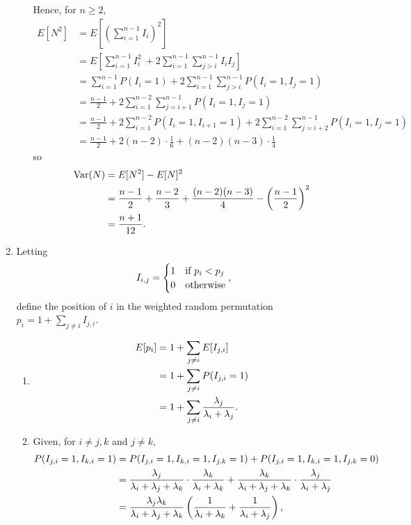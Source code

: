 \documentclass{article}
\DeclareMathOperator{\Var}{Var}
\begin{document}
\begin{enumerate}
\begin{enumerate}
        Hence, for $n \geq 2$,
        \[\begin{split}
        E[N^2]  & = E\left[\left(\sum_{i=1}^{n-1}I_i\right)^2\right] \\
                & = E\left[\sum_{i=1}^{n-1} I_i^2\ + 2\sum_{i=1}^{n-1}\sum_{j>i}^{n-1}I_iI_j\right] \\
                & = \sum_{i=1}^{n-1}P(I_i=1) + 2\sum_{i=1}^{n-1}\sum_{j>i}^{n-1}P(I_i=1, I_j=1) \\
                & = \frac{n-1}{2} + 2\sum_{i=1}^{n-2}\sum_{j=i+1}^{n-1}P(I_i=1, I_j=1) \\
                & = \frac{n-1}{2} + 2\sum_{i=1}^{n-2}P(I_i = 1, I_{i+1} = 1) + 2\sum_{i=1}^{n-2}\sum_{j=i+2}^{n-1}P(I_i = 1, I_j = 1) \\
                & = \frac{n-1}{2} + 2(n-2) \cdot \frac{1}{6} + (n-2)(n-3) \cdot \frac{1}{4}
        \end{split}\]
        so
        \[\begin{split}
        \Var(N) & = E[N^2] - E[N]^2 \\
                & = \frac{n-1}{2} + \frac{n-2}{3} + \frac{(n-2)(n-3)}{4} - \left(\frac{n-1}{2}\right)^2 \\
                & = \frac{n+1}{12}\text.
        \end{split}\]
    \end{enumerate}
\item
    Letting
    \[ I_{i,j} =
        \begin{cases}
            1 & \text{if } p_i < p_j \\
            0 & \text{otherwise}
        \end{cases} \text,
    \]
    define the position of $i$ in the weighted random permutation $p_i = 1 + \sum_{j \neq i}I_{j,i} $.

    \begin{enumerate}
    \item
    \[\begin{split}
    E[p_i]  & = 1 + \sum_{j \neq i}E[I_{j,i}] \\
            & = 1 + \sum_{j \neq i}P(I_{j,i}=1) \\
            & = 1 + \sum_{j \neq i}\frac{\lambda_j}{\lambda_i + \lambda_j} \text.
    \end{split}\]
    \item
    Given, for $i \neq j,k$ and $j \neq k$,
    \[\begin{split}
    P(I_{j,i}=1,I_{k,i}=1)  & = P(I_{j,i}=1, I_{k,i}=1 , I_{j,k} = 1) + P(I_{j,i}=1, I_{k,i}=1 , I_{j,k} = 0) \\
                            & = \frac{\lambda_j}{\lambda_i+\lambda_j+\lambda_k}\cdot\frac{\lambda_k}{\lambda_i+\lambda_k}+\frac{\lambda_k}{\lambda_i+\lambda_j+\lambda_k}\cdot\frac{\lambda_j}{\lambda_i+\lambda_j} \\
                            & =\frac{\lambda_j\lambda_k}{\lambda_i+\lambda_j+\lambda_k}\left(\frac1{\lambda_i+\lambda_k}+\frac1{\lambda_i+\lambda_j}\right)\text,
    \end{split}\]


\end{enumerate}
\end{enumerate}
\end{document}
